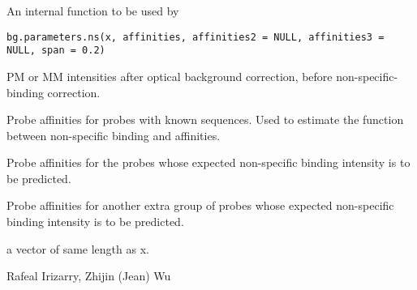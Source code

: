 \begin{Description}\relax
An internal function to be used by 
\end{Description}
\begin{Usage}
\begin{verbatim}
bg.parameters.ns(x, affinities, affinities2 = NULL, affinities3 = NULL, span = 0.2)
\end{verbatim}
\end{Usage}
\begin{Arguments}
\begin{ldescription}
\item[\code{x}] PM or MM intensities after optical background correction, before non-specific-binding correction.
\item[\code{affinities}] Probe affinities for probes with known sequences.
Used to estimate the function between non-specific binding and affinities.
\item[\code{affinities2}] Probe affinities for the probes whose expected non-specific binding
intensity is to be predicted.

\item[\code{affinities3}] Probe affinities for another extra group of probes whose expected non-specific binding
intensity is to be predicted.

\item[\code{span}] 
\end{ldescription}
\end{Arguments}
\begin{Value}
a vector of same length as x.
\end{Value}
\begin{Author}\relax
Rafeal Irizarry, Zhijin (Jean) Wu
\end{Author}
\begin{SeeAlso}\relax
{}
\end{SeeAlso}

